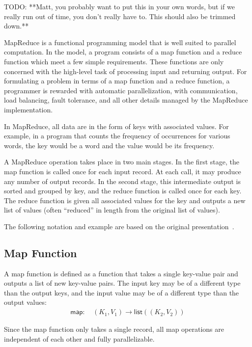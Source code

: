 \documentclass[letterpaper]{sig-alternate}
\providecommand{\List}[1]{\ensuremath{\mathsf{list}(#1)}}
\providecommand{\InputKeySet}{\ensuremath{K_1}}
\providecommand{\OutputKeySet}{\ensuremath{K_2}}
\providecommand{\InputValSet}{\ensuremath{V_1}}
\providecommand{\OutputValSet}{\ensuremath{V_2}}
\begin{document}
TODO: **Matt, you probably want to put this in your own words, but if we
really run out of time, you don't really have to.  This should also be trimmed
down.**

MapReduce is a functional programming model that is well suited to parallel
computation.  In the model, a program consists of a map function and a reduce
function which meet a few simple requirements.  These functions are only
concerned with the high-level task of processing input and returning output.
For formulating a problem in terms of a map function and a reduce function, a
programmer is rewarded with automatic parallelization, with communication,
load balancing, fault tolerance, and all other details managed by the
MapReduce implementation.

In MapReduce, all data are in the form of keys with associated values.  For
example, in a program that counts the frequency of occurrences for various
words, the key would be a word and the value would be its frequency.

A MapReduce operation takes place in two main stages.  In the first stage, the
map function is called once for each input record.  At each call, it may
produce any number of output records.  In the second stage, this intermediate
output is sorted and grouped by key, and the reduce function is called once
for each key.  The reduce function is given all associated values for the
key and outputs a new list of values (often ``reduced'' in length from the
original list of values).

The following notation and example are based on the original
presentation~\citep{dean-osdi04}.

\subsection{Map Function}

A map function is defined as a function that takes a single key-value pair and
outputs a list of new key-value pairs.  The input key may be of a different
type than the output keys, and the input value may be of a different type than
the output values:
\begin{align}
\mathsf{map}:\:&(\InputKeySet, \InputValSet) \rightarrow
    \List{(\OutputKeySet, \OutputValSet)}
\end{align}

Since the map function only takes a single record, all map operations are
independent of each other and fully parallelizable.
\end{document}
